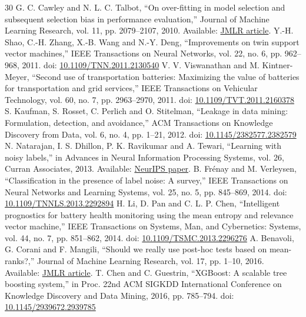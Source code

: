 \documentclass[conference,a4paper]{IEEEtran}
\begin{document}
\begin{thebibliography}{30}
 G. C. Cawley and N. L. C. Talbot, ``On over-fitting in model selection and subsequent selection bias in performance evaluation,'' Journal of Machine Learning Research, vol. 11, pp. 2079--2107, 2010. Available: \href{https://www.jmlr.org/beta/papers/v11/cawley10a.html}{JMLR article}.
 Y.-H. Shao, C.-H. Zhang, X.-B. Wang and N.-Y. Deng, ``Improvements on twin support vector machines,'' IEEE Transactions on Neural Networks, vol. 22, no. 6, pp. 962--968, 2011. doi: \href{https://doi.org/10.1109/TNN.2011.2130540}{10.1109/TNN.2011.2130540}
 V. V. Viswanathan and M. Kintner-Meyer, ``Second use of transportation batteries: Maximizing the value of batteries for transportation and grid services,'' IEEE Transactions on Vehicular Technology, vol. 60, no. 7, pp. 2963--2970, 2011. doi: \href{https://doi.org/10.1109/TVT.2011.2160378}{10.1109/TVT.2011.2160378}
 S. Kaufman, S. Rosset, C. Perlich and O. Stitelman, ``Leakage in data mining: Formulation, detection, and avoidance,'' ACM Transactions on Knowledge Discovery from Data, vol. 6, no. 4, pp. 1--21, 2012. doi: \href{https://doi.org/10.1145/2382577.2382579}{10.1145/2382577.2382579}
 N. Natarajan, I. S. Dhillon, P. K. Ravikumar and A. Tewari, ``Learning with noisy labels,'' in Advances in Neural Information Processing Systems, vol. 26, Curran Associates, 2013. Available: \href{https://proceedings.neurips.cc/paper/2013/hash/3871bd64012152bfb53fdf04b401193f-Abstract.html}{NeurIPS paper}.
 B. Fr\'enay and M. Verleysen, ``Classification in the presence of label noise: A survey,'' IEEE Transactions on Neural Networks and Learning Systems, vol. 25, no. 5, pp. 845--869, 2014. doi: \href{https://doi.org/10.1109/TNNLS.2013.2292894}{10.1109/TNNLS.2013.2292894}
 H. Li, D. Pan and C. L. P. Chen, ``Intelligent prognostics for battery health monitoring using the mean entropy and relevance vector machine,'' IEEE Transactions on Systems, Man, and Cybernetics: Systems, vol. 44, no. 7, pp. 851--862, 2014. doi: \href{https://doi.org/10.1109/TSMC.2013.2296276}{10.1109/TSMC.2013.2296276}
 A. Benavoli, G. Corani and F. Mangili, ``Should we really use post-hoc tests based on mean-ranks?,'' Journal of Machine Learning Research, vol. 17, pp. 1--10, 2016. Available: \href{https://jmlr.org/beta/papers/v17/benavoli16a.html}{JMLR article}.
 T. Chen and C. Guestrin, ``XGBoost: A scalable tree boosting system,'' in Proc. 22nd ACM SIGKDD International Conference on Knowledge Discovery and Data Mining, 2016, pp. 785--794. doi: \href{https://doi.org/10.1145/2939672.2939785}{10.1145/2939672.2939785}

\end{thebibliography}
\end{document}
